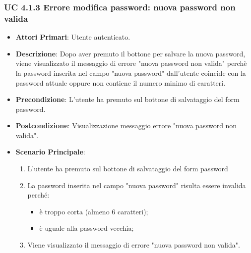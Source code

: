 			\subsubsection{UC 4.1.3 Errore modifica password: nuova password non valida}
			\begin{itemize}
				\item \textbf{Attori Primari}: Utente autenticato.
				\item \textbf{Descrizione}: Dopo aver premuto il bottone per salvare la nuova password, viene visualizzato il messaggio di errore "nuova password non valida" perchè la password inserita nel campo "nuova password" dall'utente coincide con la password attuale oppure non contiene il numero minimo di caratteri.
				\item \textbf{Precondizione}: L'utente ha premuto sul bottone di salvataggio del form password.
				\item \textbf{Postcondizione}: Visualizzazione messaggio errore "nuova password non valida".
				\item \textbf{Scenario Principale}:
				\begin{enumerate}
					\item{L'utente ha premuto sul bottone di salvataggio del form password}
					\item{La password inserita nel campo "nuova password" risulta essere invalida perché:}
					\begin{itemize}
						\item è troppo corta (almeno 6 caratteri);
						\item è uguale alla password vecchia;
					\end{itemize}
					\item{Viene visualizzato il messaggio di errore "nuova password non valida".}
				\end{enumerate}
			\end{itemize}

